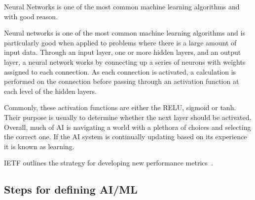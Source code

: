 Neural Networks is one of the most common machine learning algorithms and with good reason. 

Neural networks is one of the most common machine learning algorithms and is particularly good when applied to problems where there is a large amount of input data.  Through an input layer, one or more hidden layers, and an output layer, a neural network works by connecting up a series of neurons with weights assigned to each connection. As each connection is activated, a calculation is performed on the connection before passing through an activation function at each level of the hidden layers. 


Commonly, these activation functions are either the RELU, sigmoid or tanh. Their purpose is usually to determine whether the next layer should be activated.
Overall, much of AI is navigating a world with a plethora of choices and selecting the correct one. If the AI system is continually updating based on its experience it is known as learning.






IETF outlines the strategy for developing new performance metrics~\cite{clarkbcp2011}.




\subsection{Steps for defining AI/ML }


